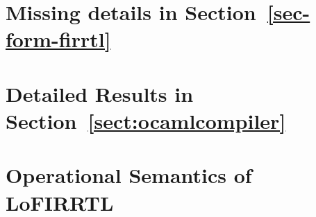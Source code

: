 

%

\section{Missing details in Section~\ref{sec-form-firrtl}}\label{app-lofirrtl}








%

\section{Detailed Results in Section~\ref{sect:ocamlcompiler}}\label{sec-detailed-results}



\section{Operational Semantics of LoFIRRTL}\label{app:lofirrtl-op-sem}



